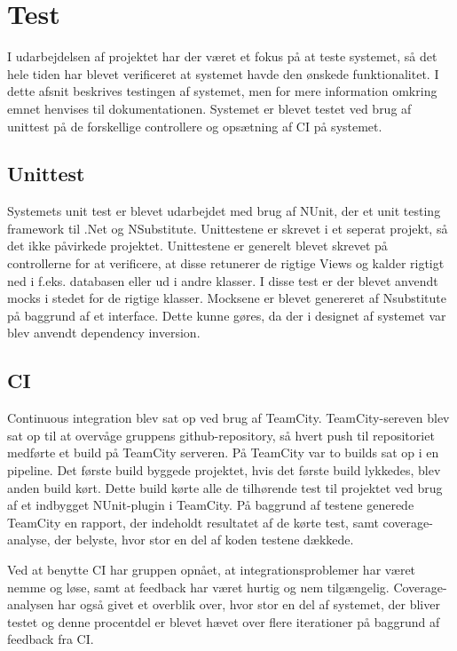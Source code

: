 \chapter{Test}
I udarbejdelsen af projektet har der været et fokus på at teste systemet, så det hele tiden har blevet verificeret at systemet havde den ønskede funktionalitet. I dette afsnit beskrives testingen af systemet, men for mere information omkring emnet henvises til dokumentationen.
Systemet er blevet testet ved brug af unittest på de forskellige controllere og opsætning af CI på systemet.

\section{Unittest}
Systemets unit test er blevet udarbejdet med brug af NUnit, der et unit testing framework til .Net og NSubstitute. Unittestene er skrevet i et seperat projekt, så det ikke påvirkede projektet.
Unittestene er generelt blevet skrevet på controllerne for at verificere, at disse retunerer de rigtige Views og kalder rigtigt ned i f.eks. databasen eller ud i andre klasser. I disse test er der blevet anvendt mocks i stedet for de rigtige klasser. Mocksene er blevet genereret af Nsubstitute på baggrund af et interface. Dette kunne gøres, da der i designet af systemet var blev anvendt dependency inversion.


\section{CI}
Continuous integration blev sat op ved brug af TeamCity. TeamCity-sereven blev sat op til at overvåge gruppens github-repository, så hvert push til repositoriet medførte et build på TeamCity serveren. På TeamCity var to builds sat op i en pipeline. Det første build byggede projektet, hvis det første build lykkedes, blev anden build kørt. Dette build kørte alle de tilhørende test til projektet ved brug af et indbygget NUnit-plugin i TeamCity. På baggrund af testene generede TeamCity en rapport, der indeholdt resultatet af de kørte test, samt coverage-analyse, der belyste, hvor stor en del af koden testene dækkede.

\noindent Ved at benytte CI har gruppen opnået, at integrationsproblemer har været nemme og løse, samt at feedback har været hurtig og nem tilgængelig. Coverage-analysen har også givet et overblik over, hvor stor en del af systemet, der bliver testet og denne procentdel er blevet hævet over flere iterationer på baggrund af feedback fra CI.